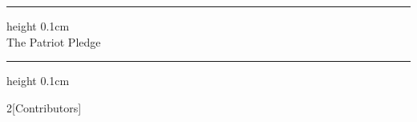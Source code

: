 \begin{titlepage}
	\begin{center}
		{
            \vspace*{2cm}
            \hrule height 0.1cm \leavevmode \\[0.5cm]
			\Huge The Patriot Pledge\\[1.25cm]
            \hrule height 0.1cm \leavevmode \\[0.5cm]
		}
        \vspace{1cm}
		{
            \begin{multicols}{2}[Contributors]
                \\[0.5cm]
                \blindtext\blindtext
            \end{multicols}
		}
	\end{center}
\end{titlepage}